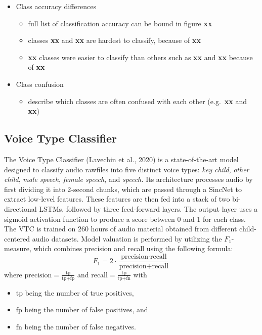 \documentclass[
  man,floatsintext]{apa6}
\providecommand{\tightlist}{%
  \setlength{\itemsep}{0pt}\setlength{\parskip}{0pt}}
\begin{document}
\begin{itemize}
\tightlist
\item
  Class accuracy differences

  \begin{itemize}
  \tightlist
  \item
    full list of classification accuracy can be bound in figure \textbf{xx}
  \item
    classes \textbf{xx} and \textbf{xx} are hardest to classify, because of \textbf{xx}
  \item
    \textbf{xx} classes were easier to classify than others such as \textbf{xx} and \textbf{xx} because of \textbf{xx}
  \end{itemize}
\item
  Class confusion

  \begin{itemize}
  \tightlist
  \item
    describe which classes are often confused with each other (e.g.~\textbf{xx} and \textbf{xx})
  \end{itemize}
\end{itemize}

\subsection{Voice Type Classifier}\label{voice-type-classifier}

The Voice Type Classifier (Lavechin et al., 2020) is a state-of-the-art model designed to classify audio rawfiles into five distinct voice types: \emph{key child}, \emph{other child}, \emph{male speech}, \emph{female speech}, and \emph{speech.} Its architecture processes audio by first dividing it into 2-second chunks, which are passed through a SincNet to extract low-level features. These features are then fed into a stack of two bi-directional LSTMs, followed by three feed-forward layers. The output layer uses a sigmoid activation function to produce a score between 0 and 1 for each class. The VTC is trained on 260 hours of audio material obtained from different child-centered audio datasets. Model valuation is performed by utilizing the \(F_1\)-measure, which combines precision and recall using the following formula:
\[
F_1 = 2 \cdot \frac{\text{precision} \cdot \text{recall}}{\text{precision} + \text{recall}}
\]
where \(\text{precision} = \frac{\text{tp}}{\text{tp} + \text{fp}}\) and \(\text{recall} = \frac{\text{tp}}{\text{tp} + \text{fn}}\) with

\begin{itemize}
\tightlist
\item
  \(\text{tp}\) being the number of true positives,
\item
  \(\text{fp}\) being the number of false positives, and
\item
  \(\text{fn}\) being the number of false negatives.
\end{itemize}
\end{document}
